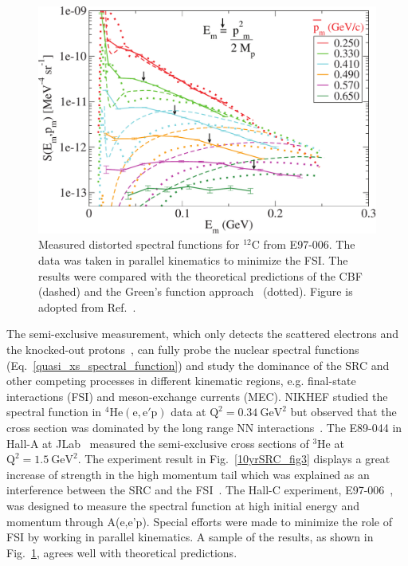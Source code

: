 \begin{figure}[!ht]
  \begin{center}
    \includegraphics[type=pdf,ext=.pdf,read=.pdf,width=0.80\linewidth]{./figures/physics/Roheresults1}
    \caption[Measured distorted spectral functions for $\mathrm{^{12}C}$ from E97-006]{\footnotesize{Measured distorted spectral functions for $\mathrm{^{12}C}$ from E97-006. The data was taken in parallel kinematics to minimize the FSI. The results were compared with the theoretical predictions of the CBF~\cite{Benhar:1994hw} (dashed) and the Green's function approach~\cite{Muther:1995bk} (dotted). Figure is adopted from Ref.~\cite{PhysRevLett.93.182501}.}}
    \label{hallc_e97006}
  \end{center}
\end{figure} 
   The semi-exclusive measurement, which only detects the scattered electrons and the knocked-out protons~\cite{PhysRevLett.94.082305}, can fully probe the nuclear spectral functions (Eq.~\eqref{quasi_xs_spectral_function}) and study the dominance of the SRC and other competing processes in different kinematic regions, e.g. final-state interactions (FSI) and meson-exchange currents (MEC). NIKHEF studied the spectral function in $\mathrm{^{4}He(e,e'p)}$ data at $\mathrm{Q^{2}=0.34~GeV^{2}}$ but observed that the cross section was dominated by the long range NN interactions~\cite{vanLeeuwe1998593,Leeuwe20016}. The E89-044 in Hall-A at JLab~\cite{PhysRevLett.94.082305} measured the semi-exclusive cross sections of $\mathrm{{^{3}He}}$ at $\mathrm{Q^{2}=1.5~GeV^{2}}$. The experiment result in Fig.~\ref{10yrSRC_fig3} displays a great increase of strength in the high momentum tail which was explained as an interference between the SRC and the FSI~\cite{src_john}. The Hall-C experiment, E97-006~\cite{PhysRevLett.93.182501}, was designed to measure the spectral function at high initial energy and momentum through A(e,e'p). Special efforts were made to minimize the role of FSI by working in parallel kinematics. A sample of the results, as shown in Fig.~\ref{hallc_e97006}, agrees well with theoretical predictions.

